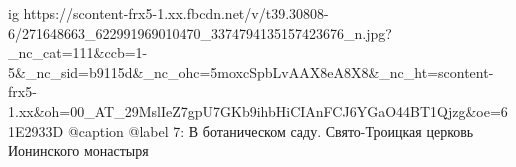  
 
 
 
 

\ifcmt
  ig https://scontent-frx5-1.xx.fbcdn.net/v/t39.30808-6/271648663_622991969010470_3374794135157423676_n.jpg?_nc_cat=111&ccb=1-5&_nc_sid=b9115d&_nc_ohc=5moxcSpbLvAAX8eA8X8&_nc_ht=scontent-frx5-1.xx&oh=00_AT_29MslIeZ7gpU7GKb9ihbHiCIAnFCJ6YGaO44BT1Qjzg&oe=61E2933D
  @caption @label 7: В ботаническом саду. Свято-Троицкая церковь Ионинского монастыря
\fi
